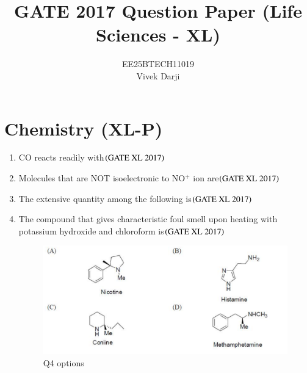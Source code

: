 \documentclass[journal]{IEEEtran}
\title{GATE 2017 Question Paper (Life Sciences - XL)}
\author{EE25BTECH11019 \\ Vivek Darji}
\date{}
\begin{document}
\maketitle
\section*{Chemistry (XL-P)}
\setcounter{enumi}{0}
\begin{enumerate}

\item CO reacts readily with\hfill $\left(\text{GATE XL 2017}\right)$
\begin{enumerate}
\end{enumerate}

\item Molecules that are NOT isoelectronic to NO$^+$ ion are\hfill $\left(\text{GATE XL 2017}\right)$
\begin{enumerate}
\end{enumerate}

\item The extensive quantity among the following is\hfill $\left(\text{GATE XL 2017}\right)$
\begin{enumerate}
\end{enumerate}

\item The compound that gives characteristic foul smell upon heating with potassium hydroxide and chloroform is\hfill $\left(\text{GATE XL 2017}\right)$
\begin{figure}[H]
    \centering
    \includegraphics[width=0.8\columnwidth]{figs/xl2017_q4_all_opts.png}
    \caption{Q4 options}
\end{figure}


\end{enumerate}
\end{document}

